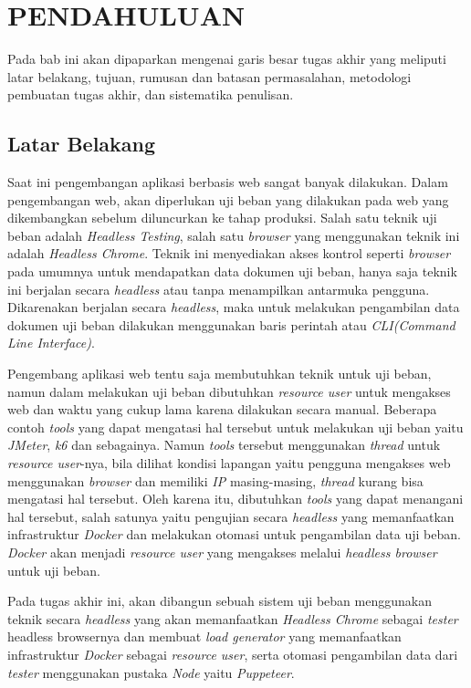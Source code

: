 \chapter{PENDAHULUAN}
	Pada bab ini akan dipaparkan mengenai garis besar tugas akhir yang meliputi latar belakang, tujuan, rumusan dan batasan permasalahan, metodologi pembuatan tugas akhir, dan sistematika penulisan.
        
	\section{Latar Belakang}
		Saat ini pengembangan aplikasi berbasis web sangat banyak dilakukan. Dalam pengembangan web, akan diperlukan uji beban yang dilakukan pada web yang dikembangkan sebelum diluncurkan ke tahap produksi. Salah satu teknik uji beban adalah \textit{Headless Testing}, salah satu \textit{browser} yang menggunakan teknik ini adalah \textit{Headless Chrome}. Teknik ini menyediakan akses kontrol seperti \textit{browser} pada umumnya untuk mendapatkan data dokumen uji beban, hanya saja teknik ini berjalan secara \textit{headless} atau tanpa menampilkan antarmuka pengguna. Dikarenakan berjalan secara \textit{headless}, maka untuk melakukan pengambilan data dokumen uji beban dilakukan menggunakan baris perintah atau \textit{CLI(Command Line Interface)}.
		
		\indent Pengembang aplikasi web tentu saja membutuhkan teknik untuk uji beban, namun dalam melakukan uji beban dibutuhkan \textit{resource user} untuk mengakses web dan waktu yang cukup lama karena dilakukan secara manual. Beberapa contoh \textit{tools} yang dapat mengatasi hal tersebut untuk melakukan uji beban yaitu \textit{JMeter}, \textit{k6} dan sebagainya. Namun \textit{tools} tersebut menggunakan \textit{thread} untuk \textit{resource user}-nya, bila dilihat kondisi lapangan yaitu pengguna mengakses web menggunakan \textit{browser} dan memiliki \textit{IP} masing-masing, \textit{thread} kurang bisa mengatasi hal tersebut. Oleh karena itu, dibutuhkan \textit{tools} yang dapat menangani hal tersebut, salah satunya yaitu pengujian secara \textit{headless} yang memanfaatkan infrastruktur \textit{Docker} dan melakukan otomasi untuk pengambilan data uji beban. \textit{Docker} akan menjadi \textit{resource user} yang mengakses melalui \textit{headless browser} untuk uji beban.
		
		\indent Pada tugas akhir ini, akan dibangun sebuah sistem uji beban menggunakan teknik secara \textit{headless} yang akan memanfaatkan \textit{Headless Chrome} sebagai \textit{tester} headless browsernya dan membuat \textit{load generator} yang memanfaatkan infrastruktur \textit{Docker} sebagai \textit{resource user}, serta otomasi pengambilan data dari \textit{tester} menggunakan pustaka \textit{Node} yaitu \textit{Puppeteer}\cite{puppeteer}.

